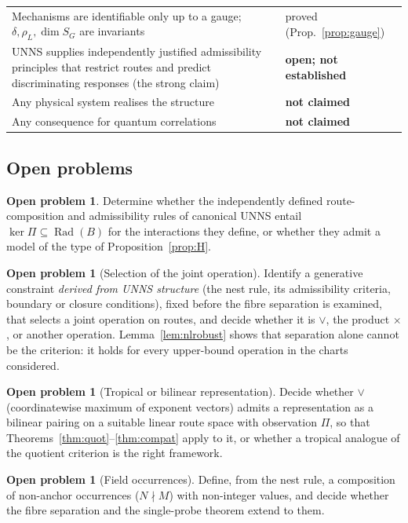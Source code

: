 \documentclass[11pt,a4paper]{article}
\newcommand{\Rad}{\operatorname{Rad}}
\newcommand{\defic}{\delta}
\newcommand{\vj}{\mathbin{\vee}}
\theoremstyle{plain}
\theoremstyle{definition}
\newtheorem{problem}[theorem]{Open problem}
\begin{document}
\begin{center}
\begin{tabularx}{\textwidth}{@{}>{\raggedright\arraybackslash}X>{\raggedright\arraybackslash}p{}@{}}
Mechanisms are identifiable only up to a gauge; $\defic,\rho_L,\dim S_G$ are invariants & proved (Prop.~\ref{prop:gauge})\\
UNNS supplies independently justified admissibility principles that restrict routes and predict discriminating responses (the strong claim) & \textbf{open; not established}\\
Any physical system realises the structure & \textbf{not claimed}\\
Any consequence for quantum correlations & \textbf{not claimed}\\
\bottomrule
\end{tabularx}
\end{center}

\subsection{Open problems}
\begin{problem}\label{prob:entail}
Determine whether the independently defined route-composition and admissibility rules of canonical UNNS entail $\ker\Pi\subseteq\Rad(B)$ for the interactions they define, or whether they admit a model of the type of Proposition~\ref{prop:H}.
\end{problem}
\begin{problem}[Selection of the joint operation]\label{prob:select}
Identify a generative constraint \emph{derived from UNNS structure} (the nest rule, its admissibility criteria, boundary or closure conditions), fixed before the fibre separation is examined, that selects a joint operation on routes, and decide whether it is $\vj$, the product $\times$, or another operation. Lemma~\ref{lem:nlrobust} shows that separation alone cannot be the criterion: it holds for every upper-bound operation in the charts considered.
\end{problem}
\begin{problem}[Tropical or bilinear representation]\label{prob:tropical}
Decide whether $\vj$ (coordinatewise maximum of exponent vectors) admits a representation as a bilinear pairing on a suitable linear route space with observation $\Pi$, so that Theorems~\ref{thm:quot}--\ref{thm:compat} apply to it, or whether a tropical analogue of the quotient criterion is the right framework.
\end{problem}
\begin{problem}[Field occurrences]\label{prob:field}
Define, from the nest rule, a composition of non-anchor occurrences ($N\nmid M$) with non-integer values, and decide whether the fibre separation and the single-probe theorem extend to them.
\end{problem}
\end{document}
